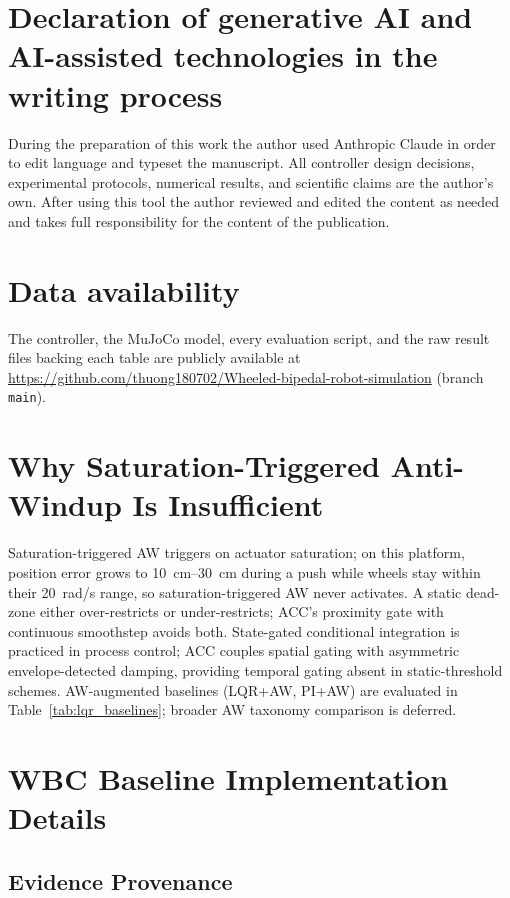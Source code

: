 \documentclass[a4paper,fleqn]{cas-dc}
\begin{document}
\section*{Declaration of generative AI and AI-assisted technologies in the writing process}
During the preparation of this work the author used Anthropic Claude in order to
edit language and typeset the manuscript. All controller design decisions,
experimental protocols, numerical results, and scientific claims are the
author's own. After using this tool the author reviewed and edited the content
as needed and takes full responsibility for the content of the publication.

\section*{Data availability}
The controller, the MuJoCo model, every evaluation script, and the raw result
files backing each table are publicly available at
\url{https://github.com/thuong180702/Wheeled-bipedal-robot-simulation}
(branch \texttt{main}).

\appendix
\section{Why Saturation-Triggered Anti-Windup Is Insufficient}
\label{sec:aw_supp}

Saturation-triggered AW triggers on actuator saturation; on this platform, position error grows to \SIrange{10}{30}{cm} during a push while wheels stay within their \SI{20}{rad/s} range, so saturation-triggered AW never activates. A static dead-zone either over-restricts or under-restricts; ACC's proximity gate with continuous smoothstep avoids both. State-gated conditional integration is practiced in process control; ACC couples spatial gating with asymmetric envelope-detected damping, providing temporal gating absent in static-threshold schemes. AW-augmented baselines (LQR+AW, PI+AW) are evaluated in Table~\ref{tab:lqr_baselines}; broader AW taxonomy comparison is deferred.

\section{WBC Baseline Implementation Details}
\label{sec:wbc_supp}

\subsection{Evidence Provenance}
\end{document}
